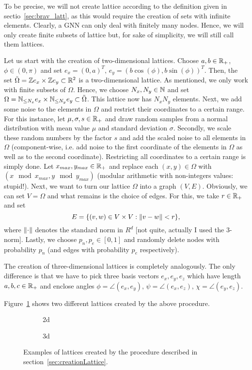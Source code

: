 \label{sec:creationLattice}

To be precise, we will not create lattice according to the definition given in sectio~\ref{sec:brav_latt}, 
as this would require the creation of sets with infinite elements. Clearly, a GNN can only deal with finitely many nodes.
Hence, we will only create finite subsets of lattice but, for sake of simplicity, we will still call them lattices.

Let us start with the creation of two-dimensional lattices.
Choose $a,b\in\mathbb{R}_+$, $\phi\in(0,\pi)$ and set
$e_x=(0,a)^T,\,e_y=(b\cos(\phi), b\sin(\phi))^T$. Then, the set $\tilde{\Omega}=\mathbb{Z} e_x\times\mathbb{Z} e_y\subset\mathbb{R}^2$ is a two-dimensional lattice.
As mentioned, we only work with finite subsets of $\Omega$. Hence, we choose $N_x,N_y\in\mathbb{N}$ and set $\Omega=\mathbb{N}_{\leq N_x}e_x\times\mathbb{N}_{\leq N_y}e_y\subset\tilde{\Omega}$.
This lattice now has $N_xN_y$ elements.
Next, we add some noise to the elements in $\Omega$ and restrict their coordinates to a certain range. For this instance, let $\mu,\sigma,s\in\mathbb{R}_+$ and draw random samples from
a normal distribution with mean value $\mu$ and standard deviation $\sigma$. Secondly, we scale these random numbers by the factor $s$ 
and add the scaled noise to all elements in $\Omega$ (component-wise, i.e. add noise to the first coordinate of the elements in $\Omega$ as well as to the second coordinate).
Restricting all coordinates to a certain range is simply done. Let $x_{max}, y_{max}\in\mathbb{R}_+$ and replace each $(x,y)\in\Omega$ with $(x \mod x_{max}, y \mod y_{max})$ (modular arithmetic with non-integers values: stupid!).
Next, we want to turn our lattice $\Omega$ into a graph $(V,E)$. Obviously, we can set $V=\Omega$ and what remains is the choice of edges. For this, we take $r\in\mathbb{R}_+$ and set
\begin{equation*}
    E=\{(v, w)\in V\times V: \lVert v-w\rVert<r\},
\end{equation*}
where $\lVert\cdot\rVert$ denotes the standard norm in $R^d$ [not quite, actually I used the 3-norm].
Lastly, we choose $p_n,p_e\in[0,1]$ and randomly delete nodes with probability $p_n$ (and edges with probability $p_e$ respectively).

The creation of three-dimensional lattices is completely analogously. The only difference is that we have to pick three basis vectors $e_x,e_y,e_z$ which have length $a,b,c\in\mathbb{R}_+$ and 
enclose angles $\phi=\angle(e_x, e_y),\,\psi=\angle(e_x,e_z),\,\chi=\angle(e_y,e_z)$. 

Figure~\ref{fig:examplesLattices} shows two different lattices created by the above procedure.

\begin{figure}
    \centering
    \begin{subfigure}[t]{0.4\textwidth}
        \centering
        \caption{2d}
    \end{subfigure}
    \hfill
    \begin{subfigure}[t]{0.4\textwidth}
        \centering
        \caption{3d}
    \end{subfigure}
    \caption{Examples of lattices created by the procedure described in section~\ref{sec:creationLattice}.}
    \label{fig:examplesLattices}
\end{figure}